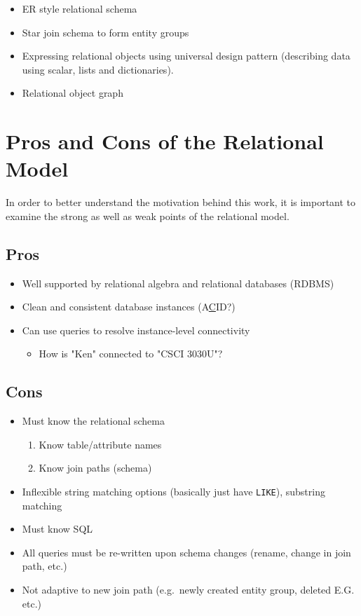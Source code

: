 	\begin{itemize}
		\item ER style relational schema
		\item Star join schema to form entity groups
		\item Expressing relational objects using universal design pattern (describing data using scalar, lists and dictionaries).
		\item Relational object graph
	\end{itemize}

\section{Pros and Cons of the Relational Model}
	In order to better understand the motivation behind this work, it is important to examine the strong as well as weak points of the relational model.
	
	\subsection{Pros}
		\begin{itemize}
			\item Well supported by relational algebra and relational databases (RDBMS)
			\item Clean and consistent database instances (A\underline{C}ID?)
			\item Can use queries to resolve instance-level connectivity
				\begin{itemize}
					\item How is "Ken" connected to "CSCI 3030U"?
				\end{itemize}
		\end{itemize}
	
	\subsection{Cons}
		\begin{itemize}
			\item Must know the relational schema
				\begin{enumerate}
					\item Know table/attribute names
					\item Know join paths (schema)
				\end{enumerate}
			\item Inflexible string matching options  (basically just have \texttt{LIKE}), substring matching
			\item Must know SQL
			\item All queries must be re-written upon schema changes (rename, change in join path, etc.)
			\item Not adaptive to new join path (e.g.\ newly created entity group, deleted E.G.\, etc.)
		\end{itemize}

